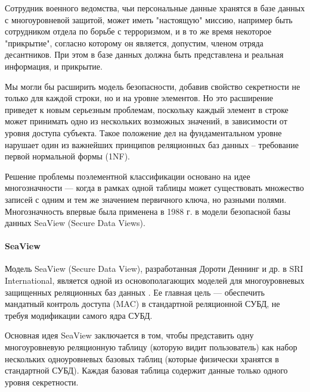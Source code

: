 Сотрудник военного ведомства, чьи персональные данные хранятся в базе данных с многоуровневой защитой, может иметь "настоящую" миссию, например быть сотрудником отдела по борьбе с терроризмом, и в то же время некоторое "прикрытие", согласно которому он является, допустим, членом отряда десантников. При этом в базе данных должна быть представлена и реальная информация, и прикрытие.

Мы могли бы расширить модель безопасности, добавив свойство секретности не только для каждой строки, но и на уровне элементов. Но это расширение приведет к новым серьезным проблемам, поскольку каждый элемент в строке может принимать одно из нескольких возможных значений, в зависимости от уровня доступа субъекта. Такое положение дел на фундаментальном уровне нарушает один из важнейших принципов реляционных баз данных – требование первой нормальной формы (1NF)\footnotemark.


Решение проблемы поэлементной классификации основано на идее многозначности ---  когда в рамках одной таблицы может существовать множество записей с одним и тем же значением первичного ключа, но разными полями.  Многозначность впервые была применена в 1988 г. в модели безопасной базы данных SeaView (Secure Data Views).

\paragraph{SeaView}
Модель SeaView (Secure Data View), разработанная Дороти Деннинг и др. в SRI International, является одной из основополагающих моделей для многоуровневых защищенных реляционных баз данных \autocite{denning1987seaview}. Ее главная цель --- обеспечить мандатный контроль доступа (MAC) в стандартной реляционной СУБД, не требуя модификации самого ядра СУБД.

Основная идея SeaView заключается в том, чтобы представить одну многоуровневую реляционную таблицу (которую видит пользователь) как набор нескольких одноуровневых базовых таблиц (которые физически хранятся в стандартной СУБД). Каждая базовая таблица содержит данные только одного уровня секретности.

